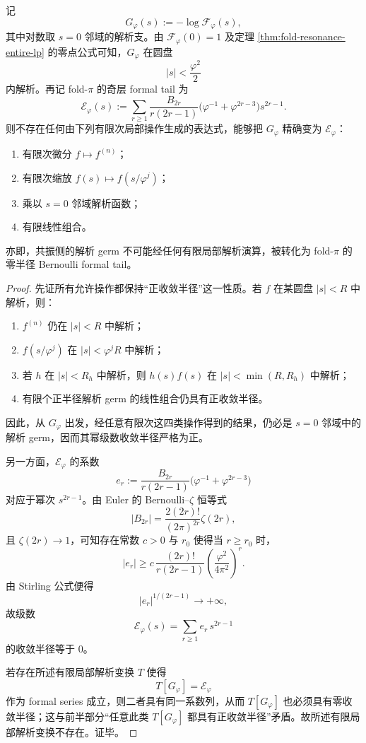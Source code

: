 \begin{theorem}\label{thm:xi-time-part9vk-no-finite-local-analytic-transform-from-resonance-germ-to-foldpi-tail}
记
\[
G_\varphi(s):=-\log \mathcal F_\varphi(s),
\]
其中对数取 \(s=0\) 邻域的解析支。由 \(\mathcal F_\varphi(0)=1\) 及定理 \ref{thm:fold-resonance-entire-lp} 的零点公式可知，\(G_\varphi\) 在圆盘
\[
|s|<\frac{\varphi^2}{2}
\]
内解析。再记 fold-\(\pi\) 的奇层 formal tail 为
\[
\mathcal E_\varphi(s):=
\sum_{r\ge 1}
\frac{B_{2r}}{r(2r-1)}
\bigl(\varphi^{-1}+\varphi^{2r-3}\bigr)s^{2r-1}.
\]
则不存在任何由下列有限次局部操作生成的表达式，能够把 \(G_\varphi\) 精确变为 \(\mathcal E_\varphi\)：
\begin{enumerate}
  \item 有限次微分 \(f\mapsto f^{(n)}\)；
  \item 有限次缩放 \(f(s)\mapsto f(s/\varphi^j)\)；
  \item 乘以 \(s=0\) 邻域解析函数；
  \item 有限线性组合。
\end{enumerate}
亦即，共振侧的解析 germ 不可能经任何有限局部解析演算，被转化为 fold-\(\pi\) 的零半径 Bernoulli formal tail。
\end{theorem}
\begin{proof}
先证所有允许操作都保持“正收敛半径”这一性质。若 \(f\) 在某圆盘 \(|s|<R\) 中解析，则：
\begin{enumerate}
  \item \(f^{(n)}\) 仍在 \(|s|<R\) 中解析；
  \item \(f(s/\varphi^j)\) 在 \(|s|<\varphi^jR\) 中解析；
  \item 若 \(h\) 在 \(|s|<R_h\) 中解析，则 \(h(s)f(s)\) 在 \(|s|<\min(R,R_h)\) 中解析；
  \item 有限个正半径解析 germ 的线性组合仍具有正收敛半径。
\end{enumerate}
因此，从 \(G_\varphi\) 出发，经任意有限次这四类操作得到的结果，仍必是 \(s=0\) 邻域中的解析 germ，因而其幂级数收敛半径严格为正。

另一方面，\(\mathcal E_\varphi\) 的系数
\[
e_r:=
\frac{B_{2r}}{r(2r-1)}
\bigl(\varphi^{-1}+\varphi^{2r-3}\bigr)
\]
对应于幂次 \(s^{2r-1}\)。由 Euler 的 Bernoulli--\(\zeta\) 恒等式
\[
|B_{2r}|=
\frac{2(2r)!}{(2\pi)^{2r}}\zeta(2r),
\]
且 \(\zeta(2r)\to 1\)，可知存在常数 \(c>0\) 与 \(r_0\) 使得当 \(r\ge r_0\) 时，
\[
|e_r|
\ge
c\,
\frac{(2r)!}{r(2r-1)}
\left(\frac{\varphi^2}{4\pi^2}\right)^r.
\]
由 Stirling 公式便得
\[
|e_r|^{1/(2r-1)}
\longrightarrow +\infty,
\]
故级数
\[
\mathcal E_\varphi(s)=\sum_{r\ge 1}e_r\,s^{2r-1}
\]
的收敛半径等于 \(0\)。

若存在所述有限局部解析变换 \(T\) 使得
\[
T[G_\varphi]=\mathcal E_\varphi
\]
作为 formal series 成立，则二者具有同一系数列，从而 \(T[G_\varphi]\) 也必须具有零收敛半径；这与前半部分“任意此类 \(T[G_\varphi]\) 都具有正收敛半径”矛盾。故所述有限局部解析变换不存在。证毕。
\end{proof}

